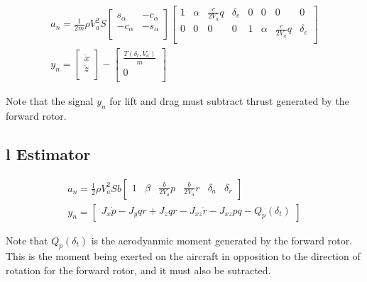 \begin{align*}
    a_n = \frac{1}{2m} \rho V_a^2 S
    \begin{bmatrix}
        s_{\alpha} & -c_{\alpha}\\
        -c_{\alpha} & -s_{\alpha}\\
    \end{bmatrix}
    \begin{bmatrix}
        1 & \alpha & \frac{c}{2 V_a} q & \delta_e & 0 & 0 & 0 & 0\\
        0 & 0 & 0 & 0 & 1 & \alpha & \frac{c}{2 V_a} q & \delta_e\\
    \end{bmatrix}\\
    y_n =
    \begin{bmatrix}
        \ddot{x}\\
        \ddot{z}\\
    \end{bmatrix}
    -
    \begin{bmatrix}
        \frac{T(\delta_t, V_a)}{m}\\
        0\\
    \end{bmatrix}
\end{align*}

Note that the signal $y_n$ for lift and drag must subtract thrust generated by the forward rotor.

\subsection{l Estimator}

\begin{align*}
    a_n = \frac{1}{2} \rho V_a^2 S b
    \begin{bmatrix}
        1 & \beta & \frac{b}{2V_a} p & \frac{b}{2V_a}r & \delta_a & \delta_r
    \end{bmatrix}\\
    y_n = 
    \begin{bmatrix}
        J_x \dot{p} - J_y q r + J_z q r - J_{xz} \dot{r} - J_{xz} p q - Q_p(\delta_t)
    \end{bmatrix}
\end{align*}

Note that $Q_p(\delta_t)$ is the aerodyanmic moment generated by the forward rotor. 
This is the moment being exerted on the aircraft in opposition to the direction of rotation for the forward rotor, and it must also be sutracted.

